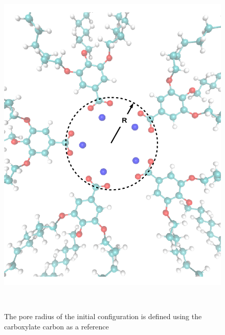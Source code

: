 \documentclass{article}
\begin{document}
  \begin{figure}
 	\centering
 	\includegraphics[width=\textwidth]{pore_radius_illustration.png}
	\caption{The pore radius of the initial configuration is defined using the 
        carboxylate carbon as a reference}~\label{fig:pore_radius_illustration}
  \end{figure}
  
\end{document}
